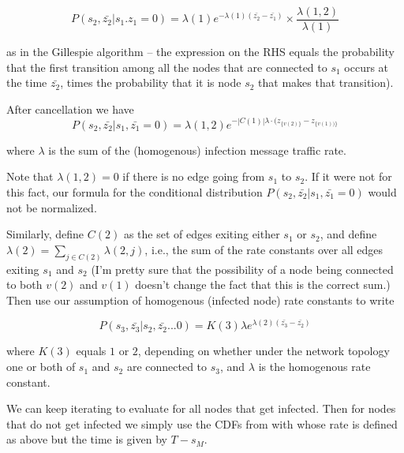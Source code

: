 \documentclass{article}
\begin{document}
\begin{equation}
P(s_2, \bar{z_2} | s_1. z_1 =0)  =
\lambda(1) e^{- \lambda(1) (\bar{z_2} - \bar{z_1})} 
\times \frac{\lambda(1,2)}{\lambda(1)}
\end{equation}

        as in the Gillespie algorithm -- the
	expression on the RHS equals the probability that the first transition
	among all the nodes that are connected to $s_1$ occurs at the time
	$\bar{z_2}$, times the probability that it is node $s_2$ that makes that
	transition). 
        
          

        After cancellation we have	
\begin{equation}
P(s_2, \bar{z_2} | s_1, \bar{z_1} = 0) =
\lambda(1, 2) e^{-|C(1)| \lambda \cdot (z_{\{v(2)\}} - z_{\{v(1))\}}}
\label{orig5}
\end{equation}

	where $\lambda$ is the sum of the (homogenous) infection message traffic rate. 

	Note that $\lambda(1, 2) = 0$ if there is no edge going from $s_1$ to
	$s_2$. If it were not for this fact, our formula for the conditional
	distribution $P(s_2, \bar{z_2} | s_1, \bar{z_1} = 0)$ would not be
	normalized.

	Similarly, define $C(2)$ as the set of edges exiting either $s_1$ or
	$s_2$, and define $\lambda(2) = \sum_{j \in C(2)} \lambda(2,j)$, i.e., the
	sum of the rate constants over all edges exiting $s_1$ and $s_2$ (I'm pretty
	sure that the possibility of a node being connected to both $v(2)$ and
	$v(1)$ doesn't change the fact that this is the correct sum.)  Then use
	our assumption of homogenous (infected node) rate constants to write

\begin{equation}
P(s_3, \bar{z_3} | s_2, \bar{z_2} ...0)  =  
K(3) \lambda e^{\lambda(2) (\bar{z_3} - \bar{z_2})} 
\end{equation}

	where $K(3)$ equals $1$ or $2$, depending on whether under the network
	topology one or both of $s_1$ and $s_2$ are connected to $s_3$, and
	$\lambda$ is the homogenous rate constant.

	We can keep iterating to evaluate for all nodes that get infected. Then for nodes that do 
        not get infected we simply use the CDFs from with whose rate is defined as above but the time
        is given by $T- s_M$.

\end{document}
